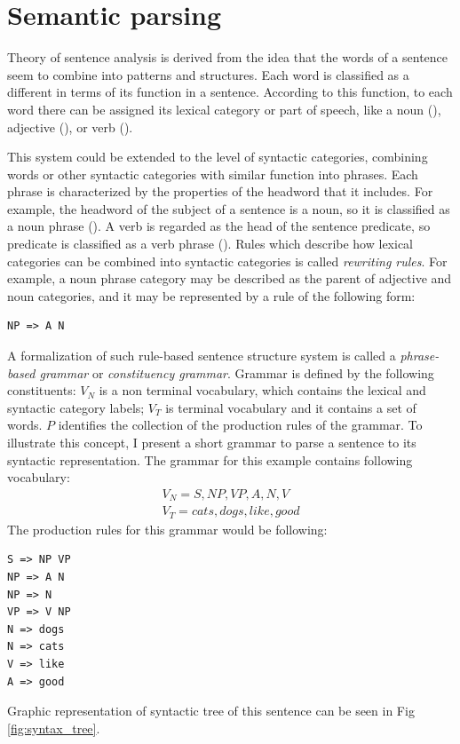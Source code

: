 \section{Semantic parsing}
Theory of sentence analysis is derived from the idea that the words of a sentence seem to combine into patterns and structures. Each word is classified as a different in terms of its function in a sentence. According to this function, to each word there can be assigned its lexical category or part of speech, like a noun (), adjective (), or verb (). 

This system could be extended to the level of syntactic categories, combining words or other syntactic categories with similar function into phrases. Each phrase is characterized by the properties of the headword that it includes. For example, the headword of the subject of a sentence is a noun, so it is classified as a noun phrase (). A verb is regarded as the head of the sentence predicate, so predicate is classified as a verb phrase (). Rules which describe how lexical categories can be combined into syntactic categories is called \emph{rewriting rules}. For example, a noun phrase category may be described as the parent of adjective and noun categories, and it may be represented by a rule of the following form:

\begin{verbatim}
NP => A N
\end{verbatim}

A formalization of such rule-based sentence structure system is called a \emph{phrase-based grammar} or \emph{constituency grammar}. Grammar is defined by the following constituents:
$V_N$ is a non terminal vocabulary, which contains the lexical and syntactic category labels;
$V_T$ is terminal vocabulary and it contains a set of words.
$P$ identifies the collection of the production rules of the grammar.
To illustrate this concept, I present a short grammar to parse a sentence  to its syntactic representation. The grammar for this example contains following vocabulary:
\begin{equation}
\begin{split}
V_N = {S, NP, VP, A, N, V}\\
V_T = {cats, dogs, like, good}
\end{split}
\end{equation}
The production rules for this grammar would be following:
\begin{verbatim}
S => NP VP
NP => A N
NP => N
VP => V NP
N => dogs
N => cats
V => like
A => good
\end{verbatim}
Graphic representation of syntactic tree  of this sentence can be seen in Fig \ref{fig:syntax_tree}.

